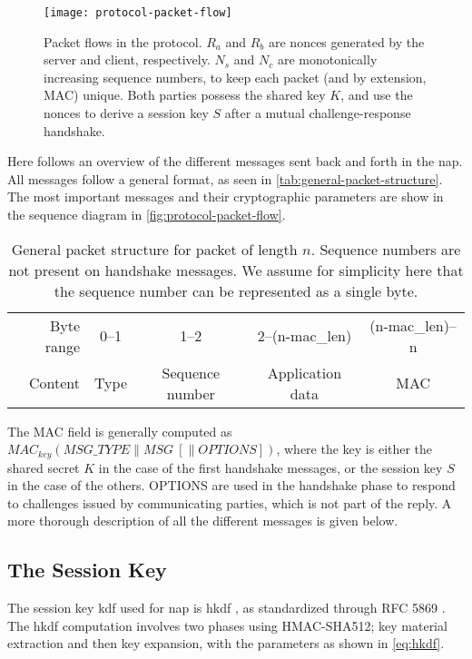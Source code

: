 \begin{figure}[ht!]
\centering
\texttt{[image: protocol-packet-flow]}
\caption{Packet flows in the protocol. \( R_a \) and \( R_b \) are nonces generated by the server and client, respectively. \( N_s \) and \( N_c \) are monotonically increasing sequence numbers, to keep each packet (and by extension, MAC) unique. Both parties possess the shared key \( K \), and use the nonces to derive a session key \( S \) after a mutual challenge-response handshake.}\label{fig:protocol-packet-flow}
\end{figure}

Here follows an overview of the different messages sent back and forth in the \acrfull{nap}. All messages follow a general format, as seen in \autoref{tab:general-packet-structure}. The most important messages and their cryptographic parameters are show in the sequence diagram in \autoref{fig:protocol-packet-flow}.

\begin{table}[ht!]
\centering
    \begin{tabular}{r | c | c | c | c |}
    \cline{2-5}
    Byte range & 0--1 & 1--2 & 2--(n-mac\_len) & (n-mac\_len)--n \\ \cline{2-5}
    Content & Type & Sequence number & Application data & MAC \\ \cline{2-5}
    \end{tabular}
    \caption{General packet structure for packet of length \( n \). Sequence numbers are not present on handshake messages. We assume for simplicity here that the sequence number can be represented as a single byte.}\label{tab:general-packet-structure}
\end{table}

The MAC field is generally computed as \( MAC_{key}(MSG\_TYPE \| MSG \ [\| OPTIONS]) \), where the key is either the shared secret \( K \) in the case of the first handshake messages, or the session key \( S \) in the case of the others. OPTIONS are used in the handshake phase to respond to challenges issued by communicating parties, which is not part of the reply. A more thorough description of all the different messages is given below.


    \subsection{The Session Key}\label{sec:session-key}

The session key \gls{kdf} used for \gls{nap} is \gls{hkdf} \cite{hkdf}, as standardized through RFC 5869 \cite{rfc5869}. The \gls{hkdf} computation involves two phases using HMAC-SHA512; key material extraction and then key expansion, with the parameters as shown in \autoref{eq:hkdf}.

